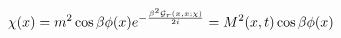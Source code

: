 \begin{equation}
\chi(x) = m^2 \cos \beta \phi(x) e^{-\frac{\beta^2 {\cal G}_r(x,x;\chi)}{2i}} = M^2
(x,t) \cos \beta \phi(x) \label{eq:space}\end{equation}

